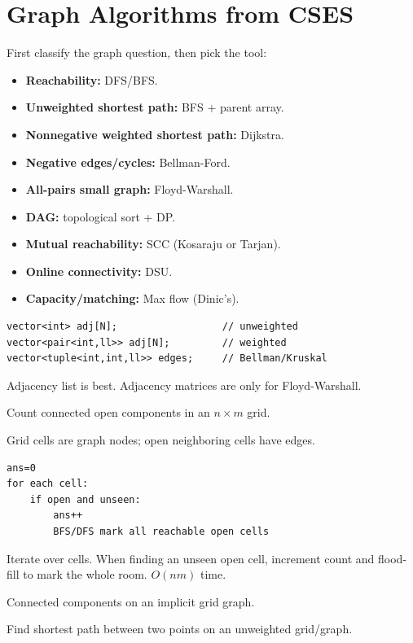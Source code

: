 \section{Graph Algorithms from CSES}

First classify the graph question, then pick the tool:
\begin{itemize}
	\item \textbf{Reachability:} DFS/BFS.
	\item \textbf{Unweighted shortest path:} BFS + parent array.
	\item \textbf{Nonnegative weighted shortest path:} Dijkstra.
	\item \textbf{Negative edges/cycles:} Bellman-Ford.
	\item \textbf{All-pairs small graph:} Floyd-Warshall.
	\item \textbf{DAG:} topological sort + DP.
	\item \textbf{Mutual reachability:} SCC (Kosaraju or Tarjan).
	\item \textbf{Online connectivity:} DSU.
	\item \textbf{Capacity/matching:} Max flow (Dinic's).
\end{itemize}

\begin{lstlisting}
vector<int> adj[N];                  // unweighted
vector<pair<int,ll>> adj[N];         // weighted
vector<tuple<int,int,ll>> edges;     // Bellman/Kruskal
\end{lstlisting}
Adjacency list is best. Adjacency matrices are only for Floyd-Warshall.


\Problem Count connected open components in an $n \times m$ grid.

\State Grid cells are graph nodes; open neighboring cells have edges.
\begin{lstlisting}
ans=0
for each cell:
    if open and unseen:
        ans++
        BFS/DFS mark all reachable open cells
\end{lstlisting}

\Solution Iterate over cells. When finding an unseen open cell, increment count and flood-fill to mark the whole room. $O(nm)$ time.

\Analysis Connected components on an implicit grid graph.


\Problem Find shortest path between two points on an unweighted grid/graph.

